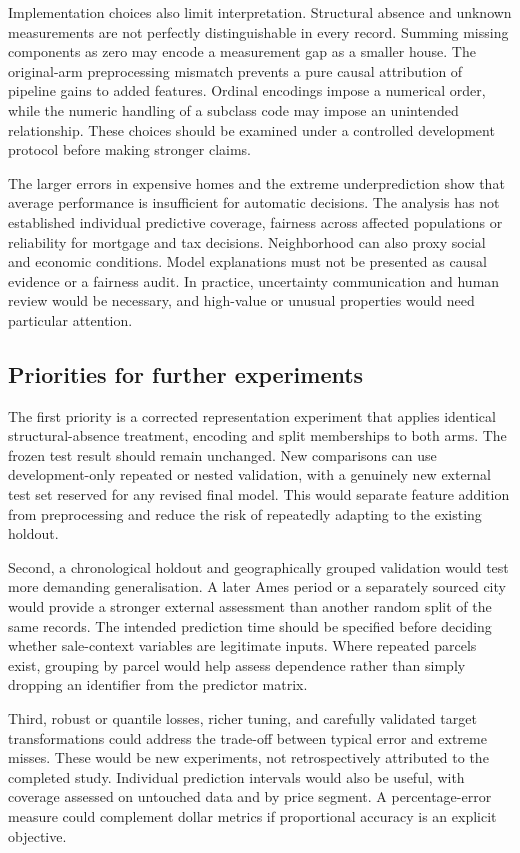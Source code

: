 \documentclass{sigkddExp}
\begin{document}
Implementation choices also limit interpretation. Structural absence and unknown measurements are not perfectly distinguishable in every record. Summing missing components as zero may encode a measurement gap as a smaller house. The original-arm preprocessing mismatch prevents a pure causal attribution of pipeline gains to added features. Ordinal encodings impose a numerical order, while the numeric handling of a subclass code may impose an unintended relationship. These choices should be examined under a controlled development protocol before making stronger claims.

The larger errors in expensive homes and the extreme underprediction show that average performance is insufficient for automatic decisions. The analysis has not established individual predictive coverage, fairness across affected populations or reliability for mortgage and tax decisions. Neighborhood can also proxy social and economic conditions. Model explanations must not be presented as causal evidence or a fairness audit. In practice, uncertainty communication and human review would be necessary, and high-value or unusual properties would need particular attention.

\subsection{Priorities for further experiments}
The first priority is a corrected representation experiment that applies identical structural-absence treatment, encoding and split memberships to both arms. The frozen test result should remain unchanged. New comparisons can use development-only repeated or nested validation, with a genuinely new external test set reserved for any revised final model. This would separate feature addition from preprocessing and reduce the risk of repeatedly adapting to the existing holdout.

Second, a chronological holdout and geographically grouped validation would test more demanding generalisation. A later Ames period or a separately sourced city would provide a stronger external assessment than another random split of the same records. The intended prediction time should be specified before deciding whether sale-context variables are legitimate inputs. Where repeated parcels exist, grouping by parcel would help assess dependence rather than simply dropping an identifier from the predictor matrix.

Third, robust or quantile losses, richer tuning, and carefully validated target transformations could address the trade-off between typical error and extreme misses. These would be new experiments, not retrospectively attributed to the completed study. Individual prediction intervals would also be useful, with coverage assessed on untouched data and by price segment. A percentage-error measure could complement dollar metrics if proportional accuracy is an explicit objective.
\end{document}
